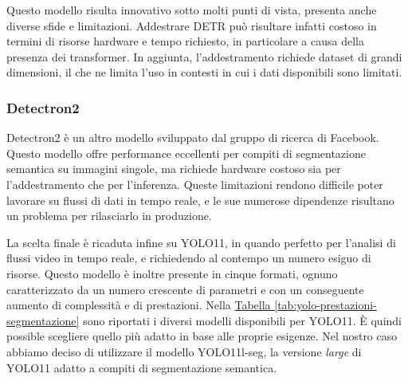 \documentclass[12pt]{report}
\begin{document}
Questo modello risulta innovativo sotto molti punti di vista, presenta anche diverse sfide e limitazioni. Addestrare DETR può risultare infatti costoso in termini di risorse hardware e tempo richiesto, in particolare a causa della presenza dei transformer. In aggiunta, l'addestramento richiede dataset di grandi dimensioni, il che ne limita l'uso in contesti in cui i dati disponibili sono limitati.

\subsubsection{Detectron2}

Detectron2 è un altro modello sviluppato dal gruppo di ricerca di Facebook. Questo modello offre performance eccellenti per compiti di segmentazione semantica su immagini singole, ma richiede hardware costoso sia per l'addestramento che per l'inferenza. Queste limitazioni rendono difficile poter lavorare su flussi di dati in tempo reale, e le sue numerose dipendenze risultano un problema per rilasciarlo in produzione.

\vspace{10pt}

La scelta finale è ricaduta infine su YOLO11, in quando perfetto per l'analisi di flussi video in tempo reale, e richiedendo al contempo un numero esiguo di risorse. Questo modello è inoltre presente in cinque formati, ognuno caratterizzato da un numero crescente di parametri e con un conseguente aumento di complessità e di prestazioni. Nella \hyperref[tab:yolo-prestazioni-segmentazione]{Tabella \ref{tab:yolo-prestazioni-segmentazione}} sono riportati i diversi modelli disponibili per YOLO11. È quindi possible scegliere quello più adatto in base alle proprie esigenze. Nel nostro caso abbiamo deciso di utilizzare il modello YOLO11l-seg, la versione \textit{large} di YOLO11 adatto a compiti di segmentazione semantica.
\end{document}
